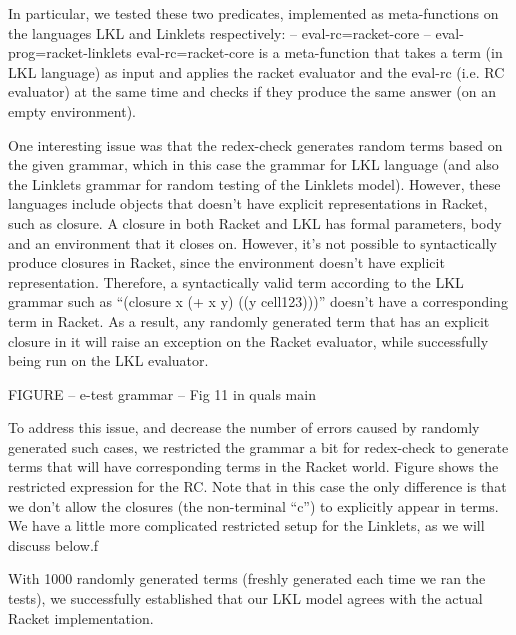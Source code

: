 			\begin{paragraph-here}%
				In particular, we tested these two predicates, implemented as meta-functions on the languages LKL and Linklets respectively: – eval-rc=racket-core – eval-prog=racket-linklets eval-rc=racket-core is a meta-function that takes a term (in LKL language) as input and applies the racket evaluator and the eval-rc (i.e. RC evaluator) at the same time and checks if they produce the same answer (on an empty environment).
			\end{paragraph-here}

			\begin{paragraph-here}%
				One interesting issue was that the redex-check generates random terms based on the given grammar, which in this case the grammar for LKL language (and also the Linklets grammar for random testing of the Linklets model). However, these languages include objects that doesn’t have explicit representations in Racket, such as closure. A closure in both Racket and LKL has formal parameters, body and an environment that it closes on. However, it’s not possible to syntactically produce closures in Racket, since the environment doesn’t have explicit representation. Therefore, a syntactically valid term according to the LKL grammar such as “(closure x (+ x y) ((y cell123)))” doesn’t have a corresponding term in Racket. As a result, any randomly generated term that has an explicit closure in it will raise an exception on the Racket evaluator, while successfully being run on the LKL evaluator.
			\end{paragraph-here}

			\begin{figure-here}
				FIGURE -- e-test grammar -- Fig 11 in quals main
			\end{figure-here}

			\begin{paragraph-here}%
				To address this issue, and decrease the number of errors caused by randomly generated such cases, we restricted the grammar a bit for redex-check to generate terms that will have corresponding terms in the Racket world. Figure shows the restricted expression for the RC. Note that in this case the only difference is that we don’t allow the closures (the non-terminal “c”) to explicitly appear in terms. We have a little more complicated restricted setup for the Linklets, as we will discuss below.f
			\end{paragraph-here}

			\begin{paragraph-here}%
				With 1000 randomly generated terms (freshly generated each time we ran the tests), we successfully established that our LKL model agrees with the actual Racket implementation.
			\end{paragraph-here}

